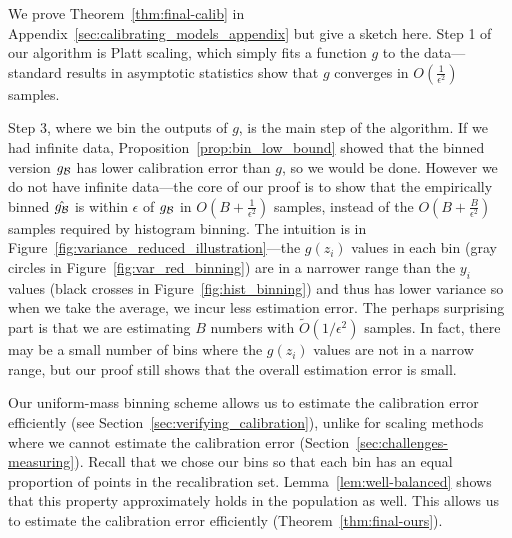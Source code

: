 We prove Theorem~\ref{thm:final-calib} in Appendix~\ref{sec:calibrating_models_appendix} but give a sketch here. Step 1 of our algorithm is Platt scaling, which simply fits a function $g$ to the data---standard results in asymptotic statistics show that $g$ converges in $O(\frac{1}{\epsilon^2})$ samples.

Step 3, where we bin the outputs of $g$, is the main step of the algorithm. If we had infinite data, Proposition~\ref{prop:bin_low_bound} showed that the binned version $g_{\mathcal{B}{}}$ has lower calibration error than $g$, so we would be done. However we do not have infinite data---the core of our proof is to show that the empirically binned $\hat{g_{\mathcal{B}{}}}$ is within $\epsilon$ of $g_{\mathcal{B}{}}$ in $O(B + \frac{1}{\epsilon^2})$ samples, instead of the $O(B + \frac{B}{\epsilon^2})$ samples required by histogram binning. The intuition is in Figure~\ref{fig:variance_reduced_illustration}---the $g(z_i)$ values in each bin (gray circles in Figure~\ref{fig:var_red_binning}) are in a narrower range than the $y_i$ values (black crosses in Figure~\ref{fig:hist_binning}) and thus has lower variance so when we take the average, we incur less estimation error. The perhaps surprising part is that we are estimating $B$ numbers with $\widetilde{O}(1/\epsilon^2)$ samples. In fact, there may be a small number of bins where the $g(z_i)$ values are not in a narrow range, but our proof still shows that the overall estimation error is small.

Our uniform-mass binning scheme allows us to estimate the calibration error efficiently (see Section~\ref{sec:verifying_calibration}), unlike for scaling methods where we cannot estimate the calibration error (Section~\ref{sec:challenges-measuring}).
Recall that we chose our bins so that each bin has an equal proportion of points in the recalibration set.
Lemma~\ref{lem:well-balanced} shows that this property approximately holds in the population as well.
This allows us to estimate the calibration error efficiently (Theorem~\ref{thm:final-ours}).

